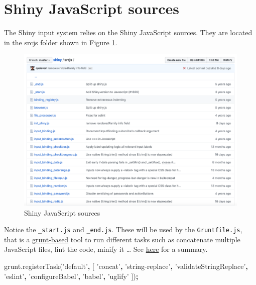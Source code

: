 \documentclass[
]{book}
\newenvironment{Shaded}{\begin{snugshade}}{\end{snugshade}}
\newcommand{\AttributeTok}[1]{\textcolor[rgb]{0.77,0.63,0.00}{#1}}
\newcommand{\NormalTok}[1]{#1}
\newcommand{\OperatorTok}[1]{\textcolor[rgb]{0.81,0.36,0.00}{\textbf{#1}}}
\newcommand{\StringTok}[1]{\textcolor[rgb]{0.31,0.60,0.02}{#1}}
\newcommand{\VariableTok}[1]{\textcolor[rgb]{0.00,0.00,0.00}{#1}}
\begin{document}
\hypertarget{shiny-javascript-sources}{%
\section{Shiny JavaScript sources}\label{shiny-javascript-sources}}

The Shiny input system relies on the Shiny JavaScript sources. They are located in the srcjs folder shown in Figure \ref{fig:shiny-js-sources}.

\begin{figure}
\includegraphics[width=32.08in]{images/survival-kit/shiny-js-sources} \caption{Shiny JavaScript sources}\label{fig:shiny-js-sources}
\end{figure}

Notice the \texttt{\_start.js} and \texttt{\_end.js}. These will be used by the \texttt{Gruntfile.js}, that is a \href{https://gruntjs.com}{grunt-based} tool to run different tasks such as concatenate multiple JavaScript files, lint the code, minify it \ldots{} See \href{https://github.com/rstudio/shiny/tree/master/tools}{here} for a summary.

\begin{Shaded}
\begin{Highlighting}[]
\VariableTok{grunt}\NormalTok{.}\AttributeTok{registerTask}\NormalTok{(}\StringTok{'default'}\OperatorTok{,}\NormalTok{ [}
  \StringTok{'concat'}\OperatorTok{,}
  \StringTok{'string-replace'}\OperatorTok{,}
  \StringTok{'validateStringReplace'}\OperatorTok{,}
  \StringTok{'eslint'}\OperatorTok{,}
  \StringTok{'configureBabel'}\OperatorTok{,}
  \StringTok{'babel'}\OperatorTok{,}
  \StringTok{'uglify'}
\NormalTok{])}\OperatorTok{;}
\end{Highlighting}
\end{Shaded}
\end{document}
